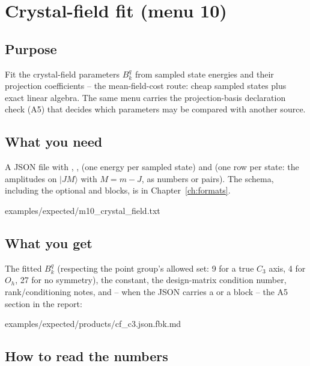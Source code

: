 \chapter{Crystal-field fit (menu 10)}
\label{ch:menu10}

\section{Purpose}

Fit the crystal-field parameters $B_k^q$ from sampled state energies and their
projection coefficients -- the mean-field-cost route: cheap sampled states plus
exact linear algebra. The same menu carries the projection-basis declaration
check (A5) that decides which parameters may be compared with another source.

\section{What you need}

A JSON file with , ,  (one energy per
sampled state) and  (one row per state: the amplitudes on
$|J M\rangle$ with $M = m - J$, as numbers or \code{[re, im]} pairs). The
schema, including the optional  and  blocks, is
in Chapter~\ref{ch:formats}.


  {examples/expected/m10_crystal_field.txt}

\section{What you get}

The fitted $B_k^q$ (respecting the point group's allowed set: 9 for a true
$C_3$ axis, 4 for $O_h$, 27 for no symmetry), the constant, the design-matrix
condition number, rank/conditioning notes, and -- when the JSON carries a
 or a  block -- the A5 section in the report:


  {examples/expected/products/cf_c3.json.fbk.md}

\section{How to read the numbers}

